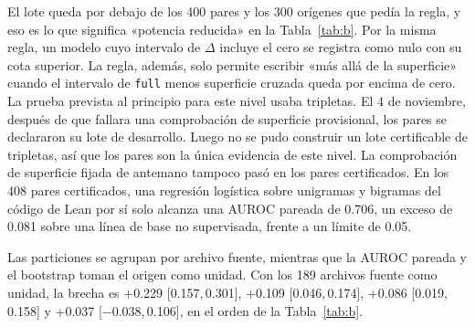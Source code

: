 \documentclass[10pt]{article}
\newcommand{\vr}[1]{\texttt{#1}}
\newcommand{\D}{\Delta}
\newcommand{\ic}[2]{[#1,\,#2]}
\begin{document}
El lote queda por debajo de los 400 pares y los 300 orígenes que pedía la regla, y eso es lo que significa
«potencia reducida» en la Tabla~\ref{tab:b}. Por la misma regla, un modelo cuyo intervalo de $\D$ incluye el cero
se registra como nulo con su cota superior. La regla, además, solo permite escribir «más allá de la superficie»
cuando el intervalo de \vr{full} menos superficie cruzada queda por encima de cero. La prueba prevista al principio
para este nivel usaba tripletas. El 4 de noviembre, después de que fallara una comprobación de superficie provisional, los pares se declararon su lote de desarrollo. Luego no se pudo construir un lote certificable de tripletas, así que los pares son la única evidencia de este nivel. La comprobación de superficie fijada de antemano tampoco pasó en los pares certificados. En los 408 pares certificados, una regresión logística
sobre unigramas y bigramas del código de Lean por sí solo alcanza una AUROC pareada de 0.706, un exceso de 0.081 sobre una línea de base
no supervisada, frente a un límite de 0.05.

Las particiones se agrupan por archivo fuente, mientras que la AUROC pareada y el bootstrap toman el origen como
unidad. Con los 189 archivos fuente como unidad, la brecha es +0.229 \ic{0.157}{0.301}, +0.109 \ic{0.046}{0.174},
+0.086 \ic{0.019}{0.158} y +0.037 \ic{−0.038}{0.106}, en el orden de la Tabla~\ref{tab:b}.
\end{document}
